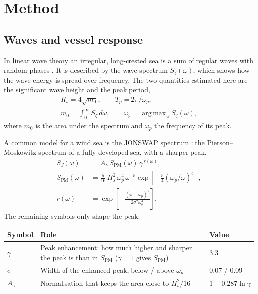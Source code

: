 \documentclass[10pt,a4paper,twocolumn,twoside]{article}
\newcommand{\Hs}{H_{s}}
\newcommand{\Tp}{T_{p}}
\DeclareMathOperator*{\argmax}{arg\,max}
\begin{document}
\section{Method}
\label{sec:method}

\subsection{Waves and vessel response}
\label{sec:theory_waves}

In linear wave theory an irregular, long-crested sea is a sum of regular waves with random phases
\citep{faltinsen1990}. It is described by the wave spectrum $S_\zeta(\omega)$, which shows how the
wave energy is spread over frequency. The two quantities estimated here are the significant wave
height and the peak period,
\begin{equation}
\begin{gathered}
\Hs = 4\sqrt{m_0}, \qquad \Tp = 2\pi/\omega_p, \\
m_0 = \int_0^\infty S_\zeta\,d\omega, \qquad \omega_p = \argmax_\omega S_\zeta(\omega),
\end{gathered}
\label{eq:hs_tp}
\end{equation}
where $m_0$ is the area under the spectrum and $\omega_p$ the frequency of its peak.

A common model for a wind sea is the JONSWAP spectrum \citep{dnv2021c205}: the
Pierson--Moskowitz spectrum of a fully developed sea, with a sharper peak.
\begin{align}
S_J(\omega) &= A_\gamma\, S_{\mathrm{PM}}(\omega)\, \gamma^{\,r(\omega)}, \label{eq:jonswap}\\
S_{\mathrm{PM}}(\omega) &= \tfrac{5}{16}\,\Hs^2\,\omega_p^4\,\omega^{-5}
\exp\!\left[-\tfrac{5}{4}\left(\omega_p/\omega\right)^4\right], \nonumber\\
r(\omega) &= \exp\!\left[-\frac{(\omega-\omega_p)^2}{2\sigma^2\omega_p^2}\right]. \nonumber
\end{align}
The remaining symbols only shape the peak:

\begin{center}\small
\begin{tabularx}{\columnwidth}{@{}l >{\raggedright\arraybackslash}X l@{}}
\toprule
Symbol & Role & Value \\
\midrule
$\gamma$ & Peak enhancement: how much higher and sharper the peak is than in $S_{\mathrm{PM}}$ ($\gamma=1$ gives $S_{\mathrm{PM}}$) & 3.3 \\
\addlinespace[4pt]
$\sigma$ & Width of the enhanced peak, below / above $\omega_p$ & 0.07 / 0.09 \\
\addlinespace[4pt]
$A_\gamma$ & Normalisation that keeps the area close to $\Hs^2/16$ & $1-0.287\ln\gamma$ \\
\bottomrule
\end{tabularx}
\end{center}
\end{document}
